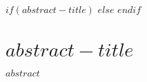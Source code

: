 $if(abstract-title)$
\newcommand{\abstracttitle}{$abstract-title$}
$else$
\newcommand{\abstracttitle}{Abstract}
$endif$
\chapter*{\abstracttitle}
\thispagestyle{plain}
$abstract$
\cleardoublepage

